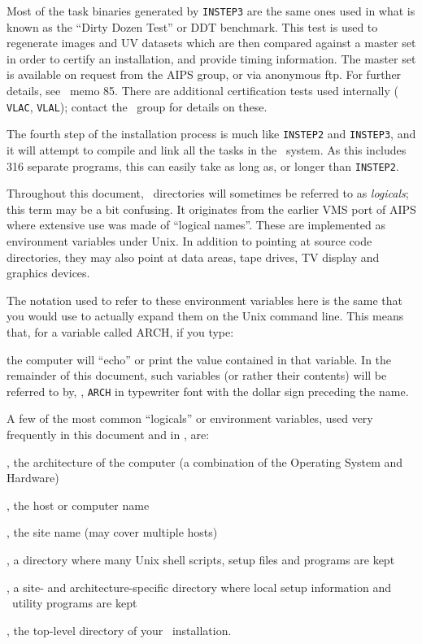 Most of the task binaries generated by {\tt INSTEP3} are the same ones
used in what is known as the ``Dirty Dozen Test'' or DDT benchmark.
This test is used to regenerate images and UV datasets which are then
compared against a master set in order to certify an installation, and
provide timing information.  The master set is available on request from
the AIPS group, or via anonymous ftp.  For further details, see \AIPS\
memo 85.  There are additional certification tests used internally ({\tt
VLAC}, {\tt VLAL}); contact the \AIPS\ group for details on these.

\medskip{}

The fourth step of the installation process is much like {\tt INSTEP2}
and {\tt INSTEP3}, and it will attempt to compile and link all the tasks
in the \AIPS\ system.  As this includes 316 separate programs,
this can easily take as long as, or longer than {\tt INSTEP2}.\medskip

\medskip{}

Throughout this document, \AIPS\ directories will sometimes be referred to
as {\it logicals\/}; this term may be a bit confusing.  It originates from
the earlier VMS port of AIPS where extensive use was made of ``logical
names''.  These are implemented as environment variables under Unix.  In
addition to pointing at source code directories, they may also point at
data areas, tape drives, TV display and graphics devices.

The notation used to refer to these environment variables here is the same
that you would use to actually expand them on the Unix command line.  This
means that, for a variable called ARCH, if you type:\medskip

\medskip

\noindent the computer will ``echo'' or print the value contained in that
variable.  In the remainder of this document, such variables (or rather
their contents) will be referred to by, \eg, {\tt\dol ARCH} in typewriter
font with the dollar sign preceding the name.

A few of the most common ``logicals'' or environment variables, used very
frequently in this document and in \AIPS, are:\medskip
\vfill\eject
\item{}, the architecture of the computer
        (a combination of the Operating System and Hardware)
\item{}, the host or computer name
\item{}, the site name (may cover multiple hosts)
\item\bul {\tt\dol SYSUNIX}, a directory where many Unix shell scripts,
        setup files and programs are kept
\item{}, a site- and architecture-specific
        directory where local setup information and \AIPS\ utility
        programs are kept
\item{}, the top-level directory of your
        \AIPS\ installation.

